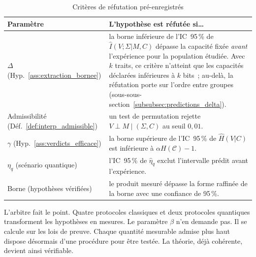 \begin{sloppypar}
\begin{table}[htbp]
\centering
\caption{Crit\`eres de r\'efutation pr\'e-enregistr\'es}
\label{tab:criteres_refutation}
\small
\begin{tabular}{@{}p{3.4cm}p{9.8cm}@{}}
\toprule
\textbf{Param\`etre} & \textbf{L'hypoth\`ese est r\'efut\'ee si\ldots} \\
\midrule
$\Delta$ (Hyp.~\ref{ass:extraction_bornee}) & la borne inf\'erieure de l'IC~95\,\% de $\hat{I}(V;\Sigma|M,C)$ d\'epasse la capacit\'e fix\'ee \emph{avant} l'exp\'erience pour la population \'etudi\'ee. Avec $k$ traits, ce crit\`ere n'atteint que les capacit\'es d\'eclar\'ees inf\'erieures \`a $k$ bits~; au-del\`a, la r\'efutation porte sur l'ordre entre groupes (sous-sous-section~\ref{subsubsec:predictions_delta}). \\
Admissibilit\'e (D\'ef.~\ref{def:interp_admissible}) & un test de permutation rejette $V \perp M \mid (\Sigma,C)$ au seuil $0{,}01$. \\
$\gamma$ (Hyp.~\ref{ass:verdicts_efficace}) & la borne sup\'erieure de l'IC~95\,\% de $\hat{H}(V|C)$ est inf\'erieure \`a $\alpha H(\mathcal{C}) - 1$. \\
$\eta_q$ (sc\'enario quantique) & l'IC~95\,\% de $\hat{\eta}_q$ exclut l'intervalle pr\'edit avant l'exp\'erience. \\
Borne (hypoth\`eses v\'erifi\'ees) & le produit mesur\'e d\'epasse la forme raffin\'ee de la borne avec une confiance de 95\,\%. \\
\bottomrule
\end{tabular}
\end{table}

\end{sloppypar}

\begin{boiteArbitre}
L'arbitre fait le point. Quatre protocoles classiques et deux protocoles
quantiques transforment les hypoth\`eses en mesures. Le param\`etre $\beta$ n'en
demande pas. Il se calcule sur les lois de preuve. Chaque quantit\'e
mesurable admise plus haut dispose d\'esormais d'une proc\'edure pour \^etre test\'ee. La
th\'eorie, d\'ej\`a coh\'erente, devient ainsi v\'erifiable.
\end{boiteArbitre}

